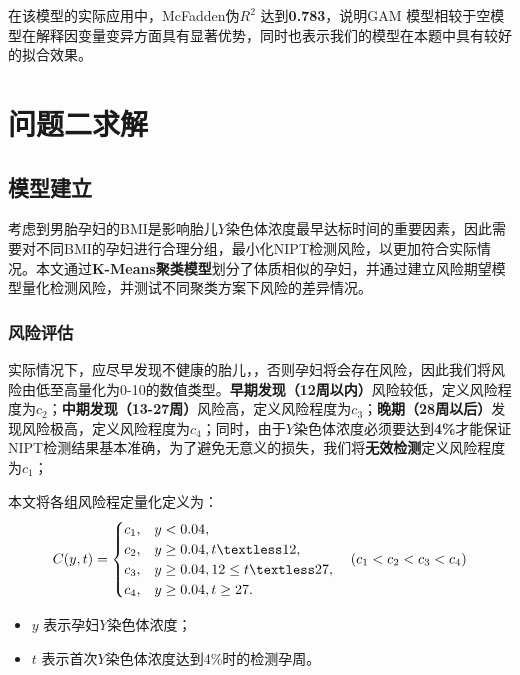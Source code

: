 \documentclass[12pt]{ctexart}
\begin{document}
	
	在该模型的实际应用中，McFadden伪$R^2$ 达到\textbf{0.783}，说明GAM 模型相较于空模型在解释因变量变异方面具有显著优势，同时也表示我们的模型在本题中具有较好的拟合效果。
	
	\section{问题二求解}

	\subsection{模型建立}
	考虑到男胎孕妇的BMI是影响胎儿$Y$染色体浓度最早达标时间的重要因素，因此需要对不同BMI的孕妇进行合理分组，最小化NIPT检测风险，以更加符合实际情况。本文通过\textbf{K-Means聚类模型}划分了体质相似的孕妇，并通过建立风险期望模型量化检测风险，并测试不同聚类方案下风险的差异情况。

	\subsubsection{风险评估}
		实际情况下，应尽早发现不健康的胎儿，，否则孕妇将会存在风险，因此我们将风险由低至高量化为0-10的数值类型。\textbf{早期发现（12周以内）}风险较低，定义风险程度为$c_2$；\textbf{中期发现（13-27周）}风险高，定义风险程度为$c_3$；\textbf{晚期（28周以后）}发现风险极高，定义风险程度为$c_4$；同时，由于$Y$染色体浓度必须要达到\textbf{4\%}才能保证NIPT检测结果基本准确，为了避免无意义的损失，我们将\textbf{无效检测}定义风险程度为$c_1$；
		
		本文将各组风险程定量化定义为：
	\[
	C(y,t) =
	\begin{cases}
		c_1, & y < 0.04, \\
		c_2, & y \geq 0.04 , t \textless 12, \\
		c_3, & y \geq 0.04 , 12 \le t \textless 27,\\
		c_4, & y \geq 0.04 ,  t \ge 27.
	\end{cases}
	\quad (c_1 < c_2 < c_3 < c_4)
	\]
	\begin{itemize}[noitemsep, topsep=0pt, parsep=0pt, partopsep=0pt, leftmargin=1.5em]
		\item $y$ 表示孕妇$Y$染色体浓度；
		\item $t$ 表示首次$Y$染色体浓度达到4\%时的检测孕周。
	\end{itemize}
	
\end{document}
